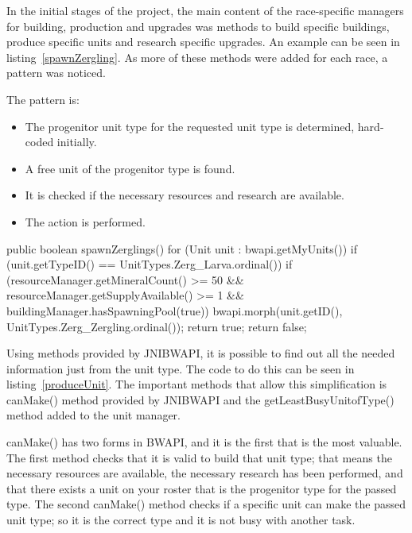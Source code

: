 \documentclass[11pt,openright,a4paper]{report}
\begin{document}
In the initial stages of the project, the main content of the race-specific managers for building, production and upgrades was methods to build specific buildings, produce specific units and research specific upgrades. An example can be seen in listing~\ref{spawnZergling}. As more of these methods were added for each race, a pattern was noticed.

The pattern is:
\begin{itemize}
\item{The progenitor unit type for the requested unit type is determined, hard-coded initially.}
\item{A free unit of the progenitor type is found.}
\item{It is checked if the necessary resources and research are available.}
\item{The action is performed.}
\end{itemize}

\begin{Code}[frame=single,language=Java,breaklines,breakatwhitespace,caption={The original method used to produce a Zergling\protect\footnote{Zerglings are the basic unit of a Zerg player's army. They are small, fast, and have a melee attack}},label=spawnZergling]
public boolean spawnZerglings(){
    for (Unit unit : bwapi.getMyUnits()) {
        if (unit.getTypeID() == UnitTypes.Zerg_Larva.ordinal()) {
            if (resourceManager.getMineralCount() >= 50 && resourceManager.getSupplyAvailable() >= 1 && buildingManager.hasSpawningPool(true))
            {
                bwapi.morph(unit.getID(), UnitTypes.Zerg_Zergling.ordinal());
                return true;
            }
        }
    }
    return false;
}
\end{Code}

Using methods provided by JNIBWAPI, it is possible to find out all the needed information just from the unit type. The code to do this can be seen in listing~\ref{produceUnit}. The important methods that allow this simplification is canMake() method provided by JNIBWAPI and the getLeastBusyUnitofType() method added to the unit manager.

canMake() has two forms in BWAPI, and it is the first that is the most valuable. The first method checks that it is valid to build that unit type; that means the necessary resources are available, the necessary research has been performed, and that there exists a unit on your roster that is the progenitor type for the passed type. The second canMake() method checks if a specific unit can make the passed unit type; so it is the correct type and it is not busy with another task.
\end{document}
